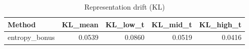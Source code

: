 \begin{table}[htbp]
\centering
\caption{Representation drift (KL)}
\label{tab:repr-drift}
\begin{tabular}{lrrrr}
\toprule
\textbf{Method} & \textbf{KL\_mean} & \textbf{KL\_low\_t} & \textbf{KL\_mid\_t} & \textbf{KL\_high\_t} \\
\midrule
entropy\_bonus & 0.0539 & 0.0860 & 0.0519 & 0.0416 \\
\bottomrule
\end{tabular}
\end{table}